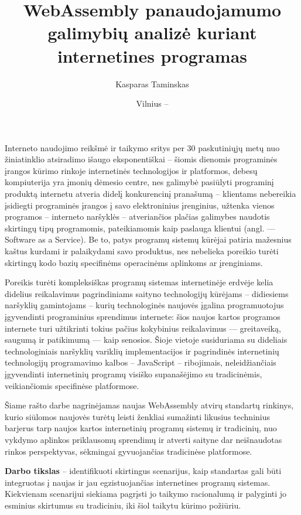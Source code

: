 \documentclass{VUMIFPSkursinis}
\title{WebAssembly panaudojamumo galimybių analizė kuriant internetines programas }
\author{Kasparas Taminskas}
\date{Vilnius – \the\year}
\begin{document}
\lstset{language=C}

\maketitle
\cleardoublepage{}

\setcounter{page}{2}
\tableofcontents

Interneto naudojimo reikšmė ir taikymo sritys per 30 paskutiniųjų metų nuo žiniatinklio atsiradimo išaugo 
eksponentiškai – šiomis dienomis programinės įrangos kūrimo rinkoje internetinės technologijos ir 
platformos, debesų kompiuterija yra įmonių dėmesio centre, nes galimybė pasiūlyti programinį 
produktą internetu atveria didelį konkurencinį pranašumą – klientams nebereikia įsidiegti 
programinės įrangos į savo elektroninius įrenginius, užtenka vienos programos – interneto 
naršyklės – atveriančios plačias galimybes naudotis skirtingų tipų programomis, pateikiamomis 
kaip paslauga klientui (angl. — Software as a Service). Be to, patys programų sistemų kūrėjai 
patiria mažesnius kaštus kurdami ir palaikydami savo produktus, nes nebelieka poreikio turėti 
skirtingų kodo bazių specifinėms operacinėms aplinkoms ar įrenginiams.

Poreikis turėti kompleksiškas programų sistemas internetinėje erdvėje kelia didelius 
reikalavimus pagrindiniams saityno technologijų kūrėjams – didiesiems naršyklių gamintojams – 
kurių technologinės naujovės įgalina programuotojus įgyvendinti programinius sprendimus 
internete: šios naujos kartos programos internete turi užtikrinti tokius pačius kokybinius 
reikalavimus — greitaveiką, saugumą ir patikimumą — kaip senosios. Šioje vietoje susiduriama 
su dideliais technologiniais naršyklių variklių implementacijos ir pagrindinės internetinių 
technologijų programavimo kalbos – JavaScript – ribojimais, neleidžiančiais įgyvendinti 
internetinių programų visiško supanašėjimo su tradicinėmis, veikiančiomis specifinėse 
platformose. 

Šiame rašto darbe nagrinėjamas naujas WebAssembly atvirų standartų rinkinys, kurio siūlomos naujovės turėtų leisti ženkliai sumažinti likusius techninius barjerus tarp 
naujos kartos internetinių programų sistemų ir tradicinių, nuo vykdymo aplinkos priklausomų 
sprendimų ir atverti saityne dar neišnaudotas rinkos perspektyvas, sėkmingai gyvuojančias
tradicinėse platformose. 

\textbf{Darbo tikslas} – identifikuoti skirtingus scenarijus, kaip standartas 
gali būti integruotas į naujas ir jau egzistuojančias internetines programų sistemas. Kiekvienam scenarijui siekiama pagrįsti jo taikymo racionalumą ir palyginti jo esminius skirtumus su tradiciniu, iki šiol taikytu kūrimo požiūriu.
\end{document}

